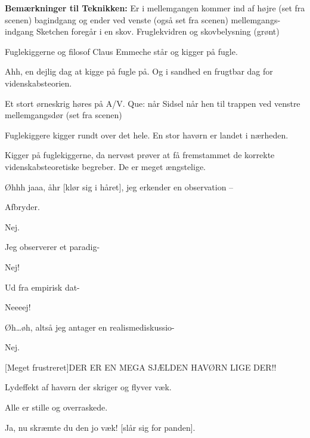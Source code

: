 \documentclass[a4paper,12pt]{article}
\begin{document}
\begin{sketch}



\scene \textbf{Bemærkninger til Teknikken:}
Er i mellemgangen kommer ind af højre (set fra scenen) bagindgang og ender ved venste (også set fra scenen) mellemgangs-indgang
Sketchen foregår i en skov. Fruglekvidren og skovbelysning (grønt)



\scene Fuglekiggerne og filosof Claus Emmeche står og kigger på fugle. 

Ahh, en dejlig dag at kigge på fugle på. Og i sandhed en frugtbar dag for videnskabsteorien.

Et stort ørneskrig høres på A/V. Que: når Sidsel når hen til trappen ved venstre mellemgangsdør (set fra scenen)

\scene Fuglekiggere kigger rundt over det hele. En stor havørn er landet i nærheden.

\scene Kigger på fuglekiggerne, da nervøst prøver at få fremstammet de korrekte videnskabsteoretiske begreber. De er meget ængstelige.

Øhhh jaaa, åhr [klør sig i håret], jeg erkender en observation -- 

Afbryder.

Nej.

Jeg observerer et paradig-

Nej!

Ud fra empirisk dat-

Neeeej!


Øh\ldots øh, altså jeg antager en realismediskussio-

Nej.

[Meget frustreret]DER ER EN MEGA SJÆLDEN HAVØRN LIGE DER!!

Lydeffekt af havørn der skriger og flyver væk.

\scene Alle er stille og overraskede.

Ja, nu skræmte du den jo væk! [slår sig for panden].



\end{sketch}
\end{document}
